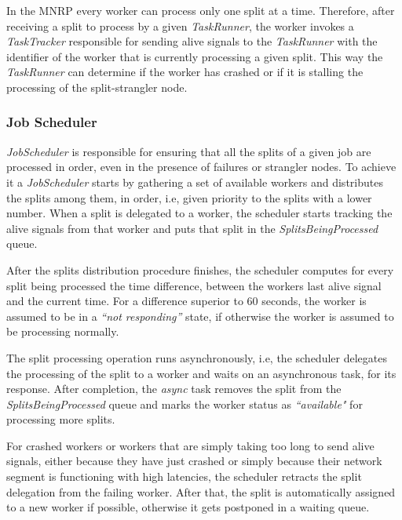 \documentclass[times, 10pt,twocolumn]{article}
\begin{document}
           In the \ac{MNRP} every worker can process only one split at a time. Therefore, after receiving a split to process by a given \textit{TaskRunner}, the worker invokes a \textit{TaskTracker} responsible for sending alive signals to the \textit{TaskRunner} with the identifier of the worker that is currently processing a given split. This way the \textit{TaskRunner} can determine if the worker has crashed or if it is stalling the processing of the split-strangler node.

        	\subsubsection{Job Scheduler}\label{job-scheduler}

            \textit{JobScheduler} is responsible for ensuring that all the splits of a given job are processed in order, even in the presence of failures or strangler nodes. To achieve it a \textit{JobScheduler} starts by gathering a set of available workers and distributes the splits among them, in order, i.e, given priority to the splits with a lower number. When a split is delegated to a worker, the scheduler starts tracking the alive signals from that worker and puts that split in the \textit{SplitsBeingProcessed} queue.

            After the splits distribution procedure finishes, the scheduler computes for every split being processed the time difference, between the workers last alive signal and the current time. For a difference superior to 60 seconds, the worker is assumed to be in a \textit{``not responding''} state, if otherwise the worker is assumed to be processing normally.

            The split processing operation runs asynchronously, i.e, the scheduler delegates the processing of the split to a worker and waits on an asynchronous task, for its response. After completion, the \textit{async} task removes the split from the \textit{SplitsBeingProcessed} queue and marks the worker status as \textit{``available"} for processing more splits.
            
            For crashed workers or workers that are simply taking too long to send alive signals, either because they have just crashed or simply because their network segment is functioning with high latencies, the scheduler retracts the split delegation from the failing worker. After that, the split is automatically assigned to a new worker if possible, otherwise it gets postponed in a waiting queue.
            
\end{document}
